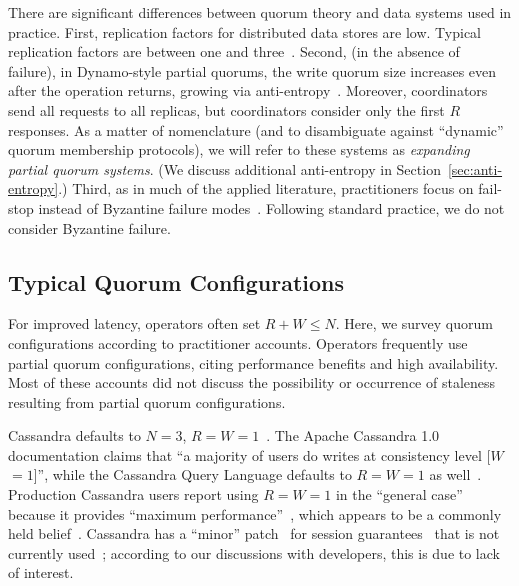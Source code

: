 \documentclass{vldb}
\newcommand{\subsectionskip}{-0em}
\begin{document}
There are significant differences between quorum theory and data
systems used in practice.  First, replication factors for distributed
data stores are low.  Typical replication factors are between one and
three~\cite{cassandradefault, feinbergpc, codapc}.  Second, (in the
absence of failure), in Dynamo-style partial quorums, the write quorum
size increases even after the operation returns, growing via
anti-entropy~\cite{antientropy}.  Moreover, coordinators send all
requests to all replicas, but coordinators consider only the first $R$ responses.  As a matter of nomenclature (and to disambiguate against
``dynamic'' quorum membership protocols), we will refer to these
systems as \textit{expanding partial quorum systems}. (We discuss
additional anti-entropy in Section~\ref{sec:anti-entropy}.) Third, as
in much of the applied literature, practitioners focus on fail-stop
instead of Byzantine failure modes~\cite{birman-byzantine}.  Following
standard practice, we do not consider Byzantine failure.


\vspace{\subsectionskip}\subsection{Typical Quorum Configurations}

For improved latency, operators often set $R+W \leq N$.  Here, we
survey quorum configurations according to practitioner accounts.
Operators frequently use partial quorum configurations, citing
performance benefits and high availability. Most of these accounts did
not discuss the possibility or occurrence of staleness resulting from
partial quorum configurations.

Cassandra defaults to $N$$=$$3$,
$R$$=$$W$$=$$1$~\cite{cassandradefault}. The Apache Cassandra 1.0
documentation claims that ``a majority of users do writes at
consistency level [$W$$=$$1$]'', while the Cassandra Query Language
defaults to $R$$=$$W$$=$$1$ as well~\cite{cassandra-docs}.  Production
Cassandra users report using $R$$=$$W$$=$$1$ in the ``general case''
because it provides ``maximum performance''~\cite{maxperfblog}, which
appears to be a commonly held belief~\cite{reddit, outbrain}.
Cassandra has a ``minor'' patch~\cite{cassandra-session} for session
guarantees~\cite{sessionguarantees} that is not currently
used~\cite{cassandra-session-revert}; according to our
discussions with developers, this is due to lack of interest.
\end{document}
